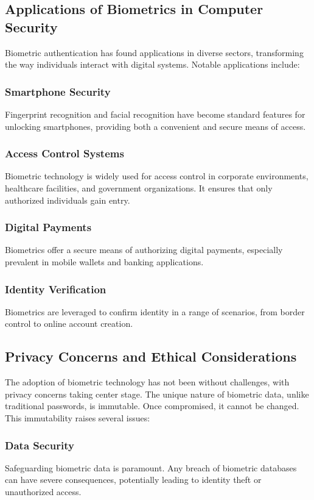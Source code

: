 \documentclass{IEEEtran}
\begin{document}
\subsection{Applications of Biometrics in Computer Security}
Biometric authentication has found applications in diverse sectors, transforming the way individuals interact with digital systems. Notable applications include:

\subsubsection{Smartphone Security}
Fingerprint recognition and facial recognition have become standard features for unlocking smartphones, providing both a convenient and secure means of access.

\subsubsection{Access Control Systems}
Biometric technology is widely used for access control in corporate environments, healthcare facilities, and government organizations. It ensures that only authorized individuals gain entry.

\subsubsection{Digital Payments}
Biometrics offer a secure means of authorizing digital payments, especially prevalent in mobile wallets and banking applications.

\subsubsection{Identity Verification}
Biometrics are leveraged to confirm identity in a range of scenarios, from border control to online account creation.

\subsection{Privacy Concerns and Ethical Considerations}
The adoption of biometric technology has not been without challenges, with privacy concerns taking center stage. The unique nature of biometric data, unlike traditional passwords, is immutable. Once compromised, it cannot be changed. This immutability raises several issues:

\subsubsection{Data Security}
Safeguarding biometric data is paramount. Any breach of biometric databases can have severe consequences, potentially leading to identity theft or unauthorized access.
\end{document}
